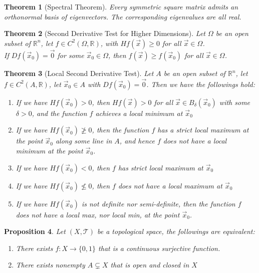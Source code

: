 \documentclass[11pt]{article}
\theoremstyle{break}
\theoremstyle{break}
\newtheorem{thm}{Theorem}[section]
\newtheorem{prop}[thm]{Proposition}
\newcommand{\R}{\mathbb{R}}
\newcommand{\T}{\mathcal{T}}
\begin{document}
\begin{thm}[Spectral Theorem]
Every symmetric square matrix admits an orthonormal basis of eigenvectors. The corresponding eigenvalues are all real.
\end{thm}

\begin{thm}[Second Derivative Test for Higher Dimensions]
Let $\Omega$ be an open subset of $\R^n$, let $f \in C^2(\Omega, \R)$, with $Hf(\vec{x})\geq 0$ for all $\vec{x}\in \Omega$. \\
If $Df(\vec{x}_0)= \vec{0}$ for some $\vec{x}_0 \in \Omega$, then $f(\vec{x}) \geq f(\vec{x}_0)$ for all $\vec{x} \in \Omega$. 
\end{thm}
\newpage
\begin{thm}[Local Second Derivative Test]
Let $A$ be an open subset of $\R^n$, let $f \in C^2(A , \R)$, let $\vec{x}_0 \in A$ with $Df(\vec{x}_0) = \vec{0}$. Then we have the followings hold:
\begin{enumerate}[topsep=3pt,itemsep=-1ex,partopsep=1ex,parsep=1ex]
\item If we have $Hf(\vec{x}_0) > 0$, then $Hf(\vec{x})>0$ for all $\vec{x}\in B_\delta(\vec{x}_0)$ with some $\delta>0$, and the function $f$ achieves a local minimum at $\vec{x}_0$
\item If we have $Hf(\vec{x}_0) \ngeq 0$, then the function $f$ has a strict local maximum at the point $\vec{x}_0$ along some line in $A$, and hence $f$ does not have a local minimum at the point $\vec{x}_0$.
\item If we have  $Hf(\vec{x}_0) < 0$, then $f$ has strict local maximum at $\vec{x}_0$
\item If we have $Hf(\vec{x}_0) \nleq 0$, then $f$ does not have a local maximum at $\vec{x}_0$
\item If we have $Hf(\vec{x}_0)$ is not definite nor semi-definite, then the function $f$ does not have a local max, nor local min, at the point $\vec{x}_0$.
\end{enumerate}
\end{thm}

\begin{prop}
Let $(X,\T)$ be a topological space, the followings are equivalent:
\begin{enumerate}[topsep=3pt,itemsep=-1ex,partopsep=1ex,parsep=1ex]
\item There exists $f:X \to \{0,1\}$ that is a continuous surjective function.
\item There exists nonempty $A \subsetneq X$ that is open and closed in $X$
\end{enumerate}
\end{prop}
\end{document}
